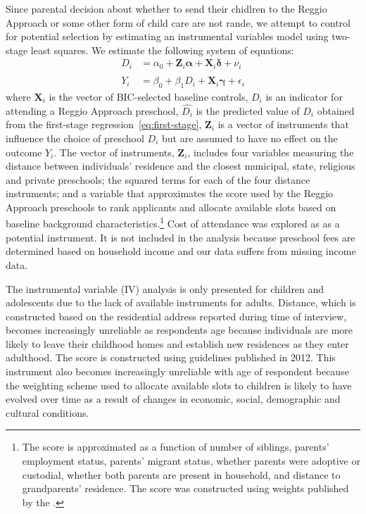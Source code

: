 Since parental decision about whether to send their chidlren to the Reggio Approach or some other form of child care are not rande, we attempt to control for potential selection by estimating an instrumental variables model using two-stage least squares. We estimate the following system of equations:
\begin{align}
D_i &= \alpha_0 + \bm{Z}_i \bm{\alpha} + \bm{X}_i \bm{\delta} + \nu_i \label{eq:first-stage}\\
Y_i &= \beta_0 + \beta_1 \hat{D_i} + \bm{X}_i \bm{\gamma} + \epsilon_i \label{eq:second-stage}
\end{align}
where %
$\bm{X}_i$ is the vector of BIC-selected baseline controls, $D_i$ is an indicator for attending a Reggio Approach preschool, $\hat{D_i}$ is the predicted value of $D_i$ obtained from the first-stage regression~\eqref{eq:first-stage}, $\bm{Z}_i$ is a vector of instruments that influence the choice of preschool $D_i$ but are assumed to have no effect on the outcome $Y_i$. The vector of instruments, $\bm{Z}_i$, includes four variables measuring the distance between individuals' residence and the closest municipal, state, religious and private preschools; the squared terms for each of the four distance instruments; and a variable that approximates the score used by the Reggio Approach preschools to rank applicants and allocate available slots based on baseline background characteristics.\footnote{The score is approximated as a function of number of siblings, parents' employment status, parents' migrant status, whether parents were adoptive or custodial, whether both parents are present in household, and distance to grandparents' residence. The score was constructed using weights published by the \citet{Reggio-Emilia_2012_Criteria-admission-2013-14}.} Cost of attendance was explored as as a potential instrument. It is not included in the analysis because preschool fees are determined based on household income and our data suffers from missing income data.

The instrumental variable (IV) analysis is only presented for children and adolescents due to the lack of available instruments for adults. Distance, which is constructed based on the residential address reported during time of interview, becomes increasingly unreliable as respondents age because individuals are more likely to leave their childhood homes and establish new residences as they enter adulthood. The score is constructed using guidelines published in 2012. This instrument also becomes increasingly unreliable with age of respondent because the weighting scheme used to allocate available slots to children is likely to have evolved over time as a result of changes in economic, social, demographic and cultural conditions.

